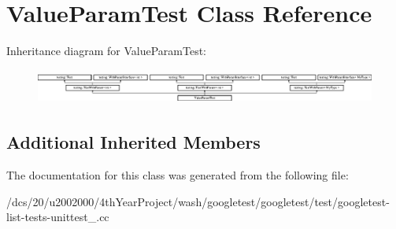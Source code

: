 \hypertarget{classValueParamTest}{}\section{Value\+Param\+Test Class Reference}
\label{classValueParamTest}
Inheritance diagram for Value\+Param\+Test\+:\begin{figure}[H]
\begin{center}
\leavevmode
\includegraphics[height=1.157025cm]{classValueParamTest}
\end{center}
\end{figure}
\subsection*{Additional Inherited Members}


The documentation for this class was generated from the following file\+:\begin{DoxyCompactItemize}
\item 
/dcs/20/u2002000/4th\+Year\+Project/wash/googletest/googletest/test/googletest-\/list-\/tests-\/unittest\+\_\+.\+cc\end{DoxyCompactItemize}
